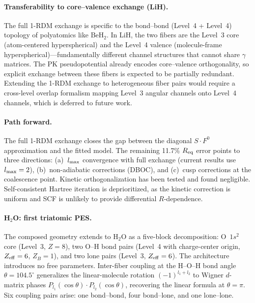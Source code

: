 \documentclass[aps,pra,twocolumn,superscriptaddress,longbibliography,floatfix]{revtex4-2}
\begin{document}
\paragraph{Transferability to core--valence exchange (LiH).}
The full 1-RDM exchange is specific to the bond--bond (Level~4 +
Level~4) topology of polyatomics like BeH$_2$.  In LiH, the two
fibers are the Level~3 core (atom-centered hyperspherical) and
the Level~4 valence (molecule-frame hyperspherical)---fundamentally
different channel structures that cannot share $\gamma$ matrices.
The PK pseudopotential already encodes core--valence orthogonality,
so explicit exchange between these fibers is expected to be
partially redundant.  Extending the 1-RDM exchange to heterogeneous
fiber pairs would require a cross-level overlap formalism mapping
Level~3 angular channels onto Level~4 channels, which is deferred
to future work.

\paragraph{Path forward.}
The full 1-RDM exchange closes the gap between the diagonal
$S \cdot F^0$ approximation and the fitted model.  The remaining
11.7\% $R_{\rm eq}$ error points to three directions: (a)~$l_{\rm max}$
convergence with full exchange (current results use $l_{\rm max} = 2$),
(b)~non-adiabatic corrections (DBOC), and (c)~cusp corrections at the
coalescence point.  Kinetic orthogonalization has been tested and found
negligible.  Self-consistent Hartree iteration is deprioritized, as
the kinetic correction is uniform and SCF is unlikely to provide
differential $R$-dependence.

\paragraph{H$_2$O: first triatomic PES.}
The composed geometry extends to H$_2$O as a five-block decomposition:
O~$1s^2$ core (Level~3, $Z=8$), two O--H bond pairs (Level~4 with
charge-center origin, $Z_{\rm eff}=6$, $Z_B=1$), and two lone pairs
(Level~3, $Z_{\rm eff}=6$).  The architecture introduces no free
parameters.  Inter-fiber coupling at the H--O--H bond angle
$\theta = 104.5^\circ$ generalizes the linear-molecule rotation
$(-1)^{l_1 + l_2}$ to Wigner $d$-matrix phases
$P_{l_1}(\cos\theta) \cdot P_{l_2}(\cos\theta)$, recovering the
linear formula at $\theta = \pi$.  Six coupling pairs arise:
one bond--bond, four bond--lone, and one lone--lone.
\end{document}
